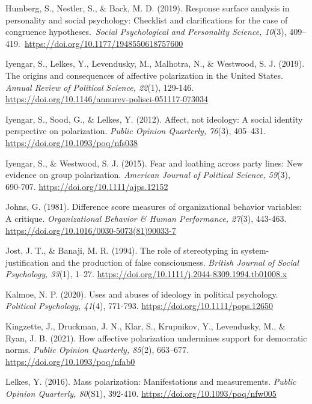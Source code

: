 \documentclass[authordate, meta]{jote-new-article}
\begin{document}
	Humberg, S., Nestler, S., \& Back, M. D. (2019). Response surface analysis in personality and social psychology: Checklist and clarifications for the case of congruence hypotheses. \emph{Social Psychological and Personality Science, 10}(3), 409--419. \url{https://doi.org/10.1177/1948550618757600}



	Iyengar, S., Lelkes, Y., Levendusky, M., Malhotra, N., \& Westwood, S. J. (2019). The origins and consequences of affective polarization in the United States. \emph{Annual Review of Political Science, 22}(1), 129-146. \url{https://doi.org/10.1146/annurev-polisci-051117-073034}



	Iyengar, S., Sood, G., \& Lelkes, Y. (2012). Affect, not ideology: A social identity perspective on polarization. \emph{Public Opinion Quarterly, 76}(3), 405--431. \url{https://doi.org/10.1093/poq/nfs038}



	Iyengar, S., \& Westwood, S. J. (2015). Fear and loathing across party lines: New evidence on group polarization. \emph{American Journal of Political Science, 59}(3), 690-707. \url{https://doi.org/10.1111/ajps.12152}



	Johns, G. (1981). Difference score measures of organizational behavior variables: A critique. \emph{Organizational Behavior \& Human Performance, 27}(3), 443-463. \url{https://doi.org/10.1016/0030-5073(81)90033-7}



	Jost, J. T., \& Banaji, M. R. (1994). The role of stereotyping in system-justification and the production of false consciousness. \emph{British Journal of Social Psychology, 33}(1), 1--27. \url{https://doi.org/10.1111/j.2044-8309.1994.tb01008.x}



	Kalmoe, N. P. (2020). Uses and abuses of ideology in political psychology. \emph{Political Psychology, 41}(4), 771-793. \url{https://doi.org/10.1111/pops.12650}



	Kingzette, J., Druckman, J. N., Klar, S., Krupnikov, Y., Levendusky, M., \& Ryan, J. B. (2021). How affective polarization undermines support for democratic norms. \emph{Public Opinion Quarterly, 85}(2), 663--677. \url{https://doi.org/10.1093/poq/nfab0}



	Lelkes, Y. (2016). Mass polarization: Manifestations and measurements. \emph{Public Opinion Quarterly, 80}(S1), 392-410. \url{https://doi.org/10.1093/poq/nfw005}
\end{document}
